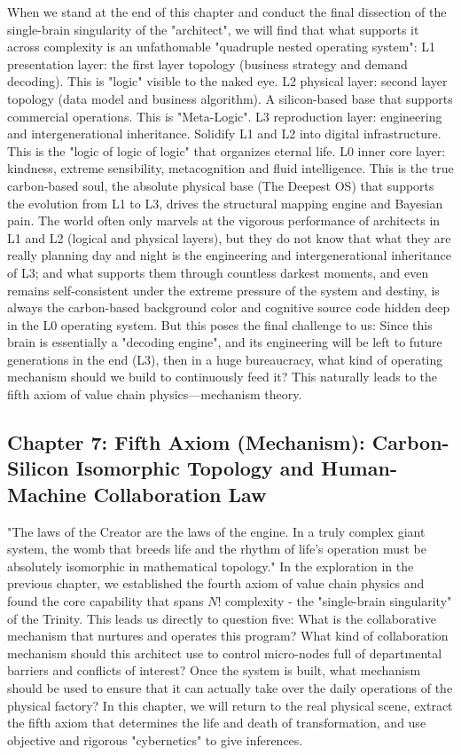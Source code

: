 \documentclass[11pt,a4paper]{article}
\begin{document}
When we stand at the end of this chapter and conduct the final dissection of the single-brain singularity of the "architect", we will find that what supports it across complexity is an unfathomable "quadruple nested operating system": L1 presentation layer: the first layer topology (business strategy and demand decoding). This is "logic" visible to the naked eye. L2 physical layer: second layer topology (data model and business algorithm). A silicon-based base that supports commercial operations. This is "Meta-Logic". L3 reproduction layer: engineering and intergenerational inheritance. Solidify L1 and L2 into digital infrastructure. This is the "logic of logic of logic" that organizes eternal life. L0 inner core layer: kindness, extreme sensibility, metacognition and fluid intelligence. This is the true carbon-based soul, the absolute physical base (The Deepest OS) that supports the evolution from L1 to L3, drives the structural mapping engine and Bayesian pain. The world often only marvels at the vigorous performance of architects in L1 and L2 (logical and physical layers), but they do not know that what they are really planning day and night is the engineering and intergenerational inheritance of L3; and what supports them through countless darkest moments, and even remains self-consistent under the extreme pressure of the system and destiny, is always the carbon-based background color and cognitive source code hidden deep in the L0 operating system. But this poses the final challenge to us: Since this brain is essentially a "decoding engine", and its engineering will be left to future generations in the end (L3), then in a huge bureaucracy, what kind of operating mechanism should we build to continuously feed it? This naturally leads to the fifth axiom of value chain physics—mechanism theory.

\subsection*{Chapter 7: Fifth Axiom (Mechanism): Carbon-Silicon Isomorphic Topology and Human-Machine Collaboration Law}
"The laws of the Creator are the laws of the engine. In a truly complex giant system, the womb that breeds life and the rhythm of life's operation must be absolutely isomorphic in mathematical topology." In the exploration in the previous chapter, we established the fourth axiom of value chain physics and found the core capability that spans $N!$ complexity - the "single-brain singularity" of the Trinity. This leads us directly to question five: What is the collaborative mechanism that nurtures and operates this program? What kind of collaboration mechanism should this architect use to control micro-nodes full of departmental barriers and conflicts of interest? Once the system is built, what mechanism should be used to ensure that it can actually take over the daily operations of the physical factory? In this chapter, we will return to the real physical scene, extract the fifth axiom that determines the life and death of transformation, and use objective and rigorous "cybernetics" to give inferences.
\end{document}
